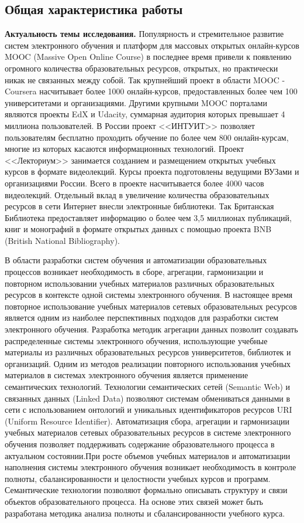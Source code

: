 \subsection*{\Large Общая характеристика работы}
\fontsize{14pt}{15pt}\selectfont


\textbf{Актуальность темы исследования.}
Популярность и стремительное развитие систем электронного обучения и платформ для массовых открытых онлайн-курсов MOOC (Massive Open Online Course) в последнее время привели к появлению огромного количества образовательных ресурсов, открытых, но практически никак не связанных между собой. Так крупнейший проект в области MOOC - Coursera насчитывает более 1000 онлайн-курсов, предоставленных более чем 100 университетами и организациями. Другими крупными MOOC порталами являются проекты EdX и Udacity, суммарная аудитория которых превышает 4 миллиона пользователей. В России проект <<ИНТУИТ>> позволяет пользователям бесплатно проходить обучение по более чем 800 онлайн-курсам, многие из которых касаются информационных технологий. Проект <<Лекториум>> занимается созданием и размещением открытых учебных курсов в формате видеолекций. Курсы проекта подготовлены ведущими ВУЗами и организациями России. Всего в проекте насчитывается более 4000 часов видеолекций. Отдельный вклад в увеличение количества образовательных ресурсов в сети Интернет внесли электронные библиотеки. Так Британская Библиотека предоставляет информацию о более чем 3,5 миллионах публикаций, книг и монографий в формате открытых данных с помощью проекта BNB (British National Bibliography). 

В области разработки систем обучения и автоматизации образовательных процессов возникает необходимость в сборе, агрегации, гармонизации и повторном использовании учебных материалов различных образовательных ресурсов в контексте одной системы электронного обучения. В настоящее время повторное использование учебных материалов сетевых образовательных ресурсов является одним из наиболее перспективных подходов для разработки систем электронного обучения. Разработка методик агрегации данных позволит создавать распределенные системы электронного обучения, использующие учебные материалы из различных образовательных ресурсов университетов, библиотек и организаций. Одним из методов реализации повторного использования учебных материалов в системах электронного обучения является применение семантических технологий. Технологии семантических сетей (Semantic Web) и связанных данных (Linked Data) позволяют системам обмениваться данными в сети с использованием онтологий и уникальных идентификаторов ресурсов URI (Uniform Resource Identifier). Автоматизация сбора, агрегации и гармонизации учебных материалов сетевых образовательных ресурсов в системе электронного обучения позволяет поддерживать содержание образовательного процесса в актуальном состоянии.При росте объемов учебных материалов и автоматизации наполнения системы электронного обучения возникает необходимость в контроле полноты, сбалансированности и целостности учебных курсов и программ. Семантические технологии позволяют формально описывать структуру и связи объектов образовательного процесса. На основе этих связей может быть разработана методика анализа полноты и сбалансированности учебного курса. 


